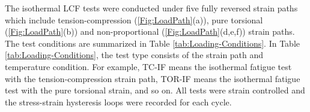 
The isothermal LCF tests were conducted under five fully reversed strain paths which include tension-compression (\ref{Fig:LoadPath}(a)), pure torsional (\ref{Fig:LoadPath}(b)) and non-proportional (\ref{Fig:LoadPath}(d,e,f)) strain paths.
The test conditions are summarized in Table \ref{tab:Loading-Conditions}.
In Table \ref{tab:Loading-Conditions}, the test type consists of the strain path and temperature condition. For example, TC-IF means the isothermal fatigue test with the tension-compression strain path, TOR-IF means the isothermal fatigue test with the pure torsional strain, and so on.
All tests were strain controlled and the stress-strain hysteresis loops were recorded for each cycle.

